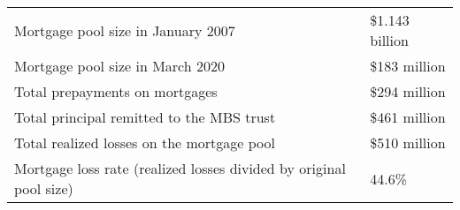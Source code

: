 \begin{tabular}{| l  | l  |}
\hline
Mortgage pool size in January 2007 & \$1.143 billion \\
Mortgage pool size in March 2020 & \$183 million \\
Total prepayments on mortgages & \$294 million \\
Total principal remitted to the MBS trust & \$461 million \\
Total realized losses on the mortgage pool & \$510 million \\
Mortgage loss rate (realized losses divided by original pool size) & 44.6\% \\
\hline
\end{tabular}